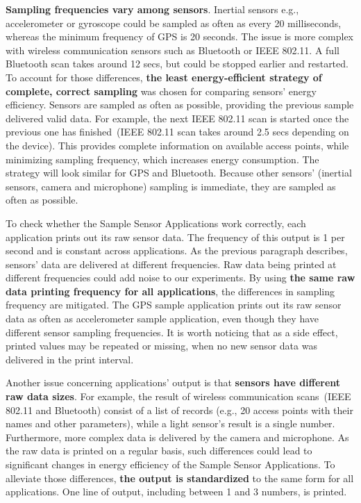\textbf{Sampling frequencies vary among sensors}. Inertial sensors e.g., accelerometer or gyroscope could be sampled as often as every 20 milliseconds, whereas the minimum frequency of GPS is 20 seconds. The issue is more complex with wireless communication sensors such as Bluetooth or IEEE 802.11. A full Bluetooth scan takes around 12 secs, but could be stopped earlier and restarted. To account for those differences, \textbf{the least energy-efficient strategy of complete, correct sampling} was chosen for comparing sensors' energy efficiency. Sensors are sampled as often as possible, providing the previous sample delivered valid data. For example, the next IEEE 802.11 scan is started once the previous one has finished\ (IEEE 802.11 scan takes around 2.5 secs depending on the device). This provides complete information on available access points, while minimizing sampling frequency, which increases energy consumption. The strategy will look similar for GPS and Bluetooth. Because other sensors' (inertial sensors, camera and microphone) sampling is immediate, they are sampled as often as possible.

To check whether the Sample Sensor Applications work correctly, each application prints out its raw sensor data. The frequency of this output is 1 per second and is constant across applications. As the previous paragraph describes, sensors' data are delivered at different frequencies. Raw data being printed at different frequencies could add noise to our experiments. By using \textbf{the same raw data printing frequency for all applications}, the differences in sampling frequency are mitigated. The GPS sample application prints out its raw sensor data as often as accelerometer sample application, even though they have different sensor sampling frequencies. It is worth noticing that as a side effect, printed values may be repeated or missing, when no new sensor data was delivered in the print interval. 

Another issue concerning applications' output is that \textbf{sensors have different raw data sizes}. For example, the result of wireless communication scans\ (IEEE 802.11 and Bluetooth) consist of a list of records (e.g., 20 access points with their names and other parameters), while a light sensor's result is a single number. Furthermore, more complex data is delivered by the camera and microphone. As the raw data is printed on a regular basis, such differences could lead to significant changes in energy efficiency of the Sample Sensor Applications. To alleviate those differences, \textbf{the output is standardized} to the same form for all applications. One line of output, including between 1 and 3 numbers, is printed.

